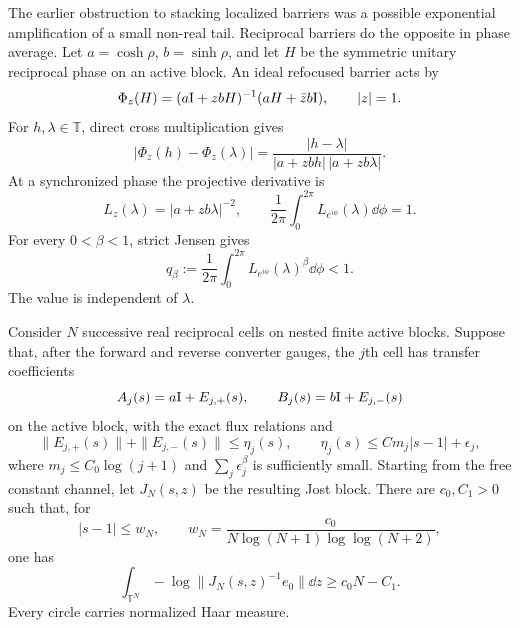 The earlier obstruction to stacking localized barriers was a possible
exponential amplification of a small non-real tail.  Reciprocal barriers do the
opposite in phase average.  Let $a=\cosh\rho$, $b=\sinh\rho$, and let $H$ be
the symmetric unitary reciprocal phase on an active block.  An ideal refocused
barrier acts by
\begin{equation}
 \Phi_z(H)=(a\mathrm I+zbH)^{-1}(aH+\bar z b\mathrm I),\qquad |z|=1.
 \label{eq:reciprocal-mobius-map}
\end{equation}
For $h,\lambda\in\mathbb T$, direct cross multiplication gives
\begin{equation}
 |\Phi_z(h)-\Phi_z(\lambda)|
 =\frac{|h-\lambda|}
 {|a+zbh|\,|a+zb\lambda|}.
 \label{eq:mobius-chord-identity}
\end{equation}
At a synchronized phase the projective derivative is
\begin{equation}
 L_z(\lambda)=|a+zb\lambda|^{-2},\qquad
 \frac1{2\pi}\int_0^{2\pi}L_{e^{i\phi}}(\lambda)\dd\phi=1.
 \label{eq:mobius-critical-derivative}
\end{equation}
For every $0<\beta<1$, strict Jensen gives
\begin{equation}
 q_\beta:=\frac1{2\pi}\int_0^{2\pi}
 L_{e^{i\phi}}(\lambda)^\beta\dd\phi<1.
 \label{eq:mobius-fractional-contraction}
\end{equation}
The value is independent of $\lambda$.

\begin{proposition}
\label{prop:robust-reciprocal-cascade}
Consider $N$ successive real reciprocal cells on nested finite active blocks.
Suppose that, after the forward and reverse converter gauges, the $j$th cell
has transfer coefficients
\begin{equation}
 A_j(s)=a\mathrm I+E_{j,+}(s),\qquad
 B_j(s)=b\mathrm I+E_{j,-}(s)
 \label{eq:near-scalar-cell-coefficients}
\end{equation}
on the active block, with the exact flux relations and
\begin{equation}
 \|E_{j,+}(s)\|+\|E_{j,-}(s)\|
 \leq\eta_j(s),\qquad
 \eta_j(s)\leq C m_j|s-1|+\epsilon_j,
 \label{eq:near-scalar-cell-error}
\end{equation}
where $m_j\leq C_0\log(j+1)$ and
$\sum_j\epsilon_j^\beta$ is sufficiently small.  Starting from the free
constant channel, let $J_N(s,z)$ be the resulting Jost block.  There are
$c_0,C_1>0$ such that, for
\begin{equation}
 |s-1|\leq w_N,\qquad
 w_N=\frac{c_0}{N\log(N+1)\log\log(N+2)},
 \label{eq:dyadic-coherence-window}
\end{equation}
one has
\begin{equation}
 \int_{\mathbb T^N}
 -\log\|J_N(s,z)^{-1}e_0\|\dd z
 \geq c_0N-C_1.
 \label{eq:robust-cascade-linear-loss}
\end{equation}
Every circle carries normalized Haar measure.
\end{proposition}

